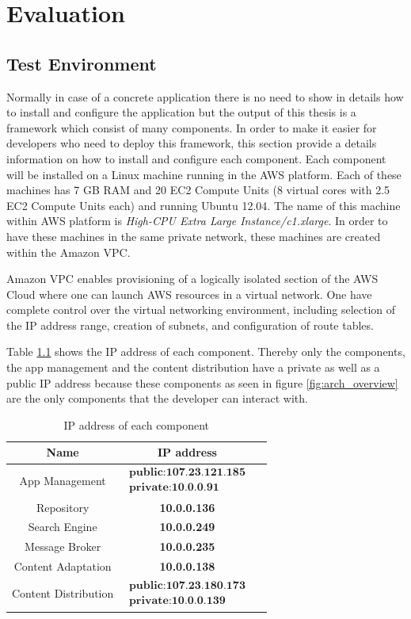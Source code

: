 \chapter{Evaluation\label{cha:chapter6}}


\section{Test Environment\label{sec:eval_te_en}}
Normally in case of a concrete application there is no need to show in details how to install and configure the application but the output of this thesis is a framework which consist of many components. In order to make it easier for developers who need to deploy this framework, this section provide a details information on how to install and configure each component. Each component will be installed on a Linux machine running in the \ac{AWS} platform. Each of these machines has 7 GB RAM and 20 \ac{EC2} Compute Units (8 virtual cores with 2.5 \ac{EC2} Compute Units each) and running Ubuntu 12.04. The name of this machine within \ac{AWS} platform is \textit{High-CPU Extra Large Instance/c1.xlarge}. In order to have these machines in the same private network, these machines are created within the Amazon \ac{VPC}. 

Amazon \ac{VPC} enables provisioning of a logically isolated section of the AWS Cloud where one can launch AWS resources in a virtual network. One have complete control over the virtual networking environment, including selection of the IP address range, creation of subnets, and configuration of route tables.

Table \ref{tbl:ap_addresses} shows the IP address of each component. Thereby only the components, the app management and the content distribution have a private as well as a public IP address because these components as seen in figure \ref{fig:arch_overview} are the only components that the developer can interact with. 

\begin{table}[htb]
\begin{tabular}{|c|c|c|}
\hline 
Name & IP address \\ 
\hline 
App Management & $\begin{array}{l} \textbf{public:107.23.121.185} \\ \textbf{private:10.0.0.91}  \end{array}$ \\ 
\hline 
Repository & \textbf{10.0.0.136} \\ 
\hline 
Search Engine & \textbf{10.0.0.249} \\ 
\hline
Message Broker & \textbf{10.0.0.235} \\ 
\hline
Content Adaptation & \textbf{10.0.0.138} \\ 
\hline
Content Distribution & $\begin{array}{l} \textbf{public:107.23.180.173} \\ \textbf{private:10.0.0.139}  \end{array}$ \\ 
\hline
\end{tabular} 
\caption{IP address of each component}
\label{tbl:ap_addresses}
\end{table} 

